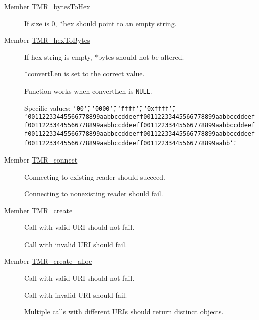 \label{test__test000013}
\hypertarget{test__test000013}{}
 \begin{description}
\item[Member \hyperlink{hex__bytes_8c_ebfeac0977014965d178a396f6d74944}{TMR\_\-bytesToHex} ]If size is 0, $\ast$hex should point to an empty string. \end{description}


\label{test__test000012}
\hypertarget{test__test000012}{}
 \begin{description}
\item[Member \hyperlink{hex__bytes_8c_96a5d471a62fa37b1a66e894c04b98af}{TMR\_\-hexToBytes} ]If hex string is empty, $\ast$bytes should not be altered. 

$\ast$convertLen is set to the correct value. 

Function works when convertLen is {\tt NULL}. 

Specific values: {\tt \char`\"{}00\char`\"{}}, {\tt \char`\"{}0000\char`\"{}}, {\tt \char`\"{}ffff\char`\"{}}, {\tt \char`\"{}0xffff\char`\"{}}, {\tt \char`\"{}00112233445566778899aabbccddeeff00112233445566778899aabbccddeeff00112233445566778899aabbccddeeff00112233445566778899aabbccddeeff00112233445566778899aabbccddeeff00112233445566778899aabbccddeeff00112233445566778899aabbccddeeff00112233445566778899aabb\char`\"{}}. \end{description}


\label{test__test000003}
\hypertarget{test__test000003}{}
 \begin{description}
\item[Member \hyperlink{group__reader_gf4d6e37515b6206807f60e2d21ca1e52}{TMR\_\-connect} ]Connecting to existing reader should succeed. 

Connecting to nonexisting reader should fail. \end{description}


\label{test__test000001}
\hypertarget{test__test000001}{}
 \begin{description}
\item[Member \hyperlink{group__reader_g77b9edd8d948ab1e1d9b95bf546cc43e}{TMR\_\-create} ]Call with valid URI should not fail. 

Call with invalid URI should fail. \end{description}


\label{test__test000002}
\hypertarget{test__test000002}{}
 \begin{description}
\item[Member \hyperlink{group__reader_g3a75a6998463bfdf20242a3fb9c82427}{TMR\_\-create\_\-alloc} ]Call with valid URI should not fail. 

Call with invalid URI should fail. 

Multiple calls with different URIs should return distinct objects. \end{description}


